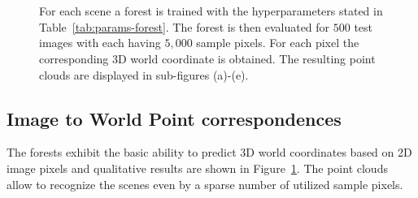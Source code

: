\documentclass[final]{cvpr}
\begin{document}
\begin{figure}
	\begin{center}
	\,
	\,
	\\
	\,
	\,
	\end{center}
	\caption{For each scene a forest is trained with the hyperparameters stated in Table~\ref{tab:params-forest}. The forest 
	is then evaluated for $500$ test images with each having $5,000$ sample pixels. For each pixel the corresponding
	3D world coordinate is obtained. The resulting point clouds are displayed in sub-figures (a)-(e). }
	\label{fig:pointclouds}
\end{figure}

\subsection{Image to World Point correspondences} \label{subsec:eval-forest}
The forests exhibit the basic ability to predict 3D world coordinates based on 2D image pixels and 
qualitative results are shown in Figure~\ref{fig:pointclouds}. The point clouds 
allow to recognize the scenes even by a sparse number of utilized sample pixels. 
\end{document}
